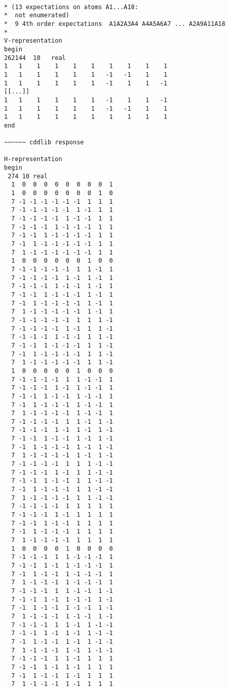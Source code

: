 \documentclass[%
  twocolumn,
 showpacs,
 showkeys,
 preprintnumbers,
 amsmath,amssymb,
 aps,
  pra,
  longbibliography,
 floatfix,
 ]{revtex4-1}
\begin{document}
{ \begin{lstlisting}[backgroundcolor=\color{yellow!10},framerule=0pt,breaklines=true, frame=tb]

* (13 expectations on atoms A1...A18:
*  not enumerated)
*  9 4th order expectations  A1A2A3A4 A4A5A6A7 ... A2A9A11A18
*
V-representation
begin
262144  10   real
1   1    1    1    1    1    1    1    1    1
1   1    1    1    1    1   -1   -1    1    1
1   1    1    1    1    1   -1    1    1   -1
[[...]]
1   1    1    1    1    1   -1    1    1   -1
1   1    1    1    1    1   -1   -1    1    1
1   1    1    1    1    1    1    1    1    1
end

~~~~~~ cddlib response

H-representation
begin
 274 10 real
  1  0  0  0  0  0  0  0  0  1
  1  0  0  0  0  0  0  0  1  0
  7 -1 -1 -1 -1 -1 -1  1  1  1
  7 -1 -1 -1 -1 -1  1 -1  1  1
  7 -1 -1 -1 -1  1 -1 -1  1  1
  7 -1 -1 -1  1 -1 -1 -1  1  1
  7 -1 -1  1 -1 -1 -1 -1  1  1
  7 -1  1 -1 -1 -1 -1 -1  1  1
  7  1 -1 -1 -1 -1 -1 -1  1  1
  1  0  0  0  0  0  0  1  0  0
  7 -1 -1 -1 -1 -1  1  1 -1  1
  7 -1 -1 -1 -1  1 -1  1 -1  1
  7 -1 -1 -1  1 -1 -1  1 -1  1
  7 -1 -1  1 -1 -1 -1  1 -1  1
  7 -1  1 -1 -1 -1 -1  1 -1  1
  7  1 -1 -1 -1 -1 -1  1 -1  1
  7 -1 -1 -1 -1 -1  1  1  1 -1
  7 -1 -1 -1 -1  1 -1  1  1 -1
  7 -1 -1 -1  1 -1 -1  1  1 -1
  7 -1 -1  1 -1 -1 -1  1  1 -1
  7 -1  1 -1 -1 -1 -1  1  1 -1
  7  1 -1 -1 -1 -1 -1  1  1 -1
  1  0  0  0  0  0  1  0  0  0
  7 -1 -1 -1 -1  1  1 -1 -1  1
  7 -1 -1 -1  1 -1  1 -1 -1  1
  7 -1 -1  1 -1 -1  1 -1 -1  1
  7 -1  1 -1 -1 -1  1 -1 -1  1
  7  1 -1 -1 -1 -1  1 -1 -1  1
  7 -1 -1 -1 -1  1  1 -1  1 -1
  7 -1 -1 -1  1 -1  1 -1  1 -1
  7 -1 -1  1 -1 -1  1 -1  1 -1
  7 -1  1 -1 -1 -1  1 -1  1 -1
  7  1 -1 -1 -1 -1  1 -1  1 -1
  7 -1 -1 -1 -1  1  1  1 -1 -1
  7 -1 -1 -1  1 -1  1  1 -1 -1
  7 -1 -1  1 -1 -1  1  1 -1 -1
  7 -1  1 -1 -1 -1  1  1 -1 -1
  7  1 -1 -1 -1 -1  1  1 -1 -1
  7 -1 -1 -1 -1  1  1  1  1  1
  7 -1 -1 -1  1 -1  1  1  1  1
  7 -1 -1  1 -1 -1  1  1  1  1
  7 -1  1 -1 -1 -1  1  1  1  1
  7  1 -1 -1 -1 -1  1  1  1  1
  1  0  0  0  0  1  0  0  0  0
  7 -1 -1 -1  1  1 -1 -1 -1  1
  7 -1 -1  1 -1  1 -1 -1 -1  1
  7 -1  1 -1 -1  1 -1 -1 -1  1
  7  1 -1 -1 -1  1 -1 -1 -1  1
  7 -1 -1 -1  1  1 -1 -1  1 -1
  7 -1 -1  1 -1  1 -1 -1  1 -1
  7 -1  1 -1 -1  1 -1 -1  1 -1
  7  1 -1 -1 -1  1 -1 -1  1 -1
  7 -1 -1 -1  1  1 -1  1 -1 -1
  7 -1 -1  1 -1  1 -1  1 -1 -1
  7 -1  1 -1 -1  1 -1  1 -1 -1
  7  1 -1 -1 -1  1 -1  1 -1 -1
  7 -1 -1 -1  1  1 -1  1  1  1
  7 -1 -1  1 -1  1 -1  1  1  1
  7 -1  1 -1 -1  1 -1  1  1  1
  7  1 -1 -1 -1  1 -1  1  1  1

\end{lstlisting}}
\end{document}
